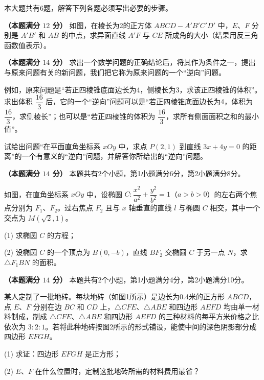本大题共有6题，解答下列各题必须写出必要的步骤。

\Needspace{0.4\textheight}
\begin{question}
\textbf{（本题满分 $12$ 分）} 如图，在棱长为2的正方体 $ABCD-A'B'C'D'$ 中，$E$、$F$ 分别是 $A'B'$ 和 $AB$ 的中点，求异面直线 $A'F$ 与 $CE$ 所成角的大小（结果用反三角函数值表示）。
\nopagebreak[4]
\begin{center}\end{center}
\nopagebreak[4]
\end{question}
\begin{question}
\textbf{（本题满分 $14$ 分）} 求出一个数学问题的正确结论后，将其作为条件之一，提出与原来问题有关的新问题，我们把它称为原来问题的一个“逆向”问题。

例如，原来问题是“若正四棱锥底面边长为4，侧棱长为3，求该正四棱锥的体积”。求出体积 $\dfrac{16}3$ 后，它的一个“逆向”问题可以是“若正四棱锥底面边长为4，体积为 $\dfrac{16}3$，求侧棱长”；也可以是“若正四棱锥的体积为 $\dfrac{16}3$，求所有侧面面积之和的最小值”。

试给出问题“在平面直角坐标系 $xOy$ 中，求点 $P(2,1)$ 到直线 $3x+4y=0$ 的距离”的一个有意义的“逆向”问题，并解答你所给出的“逆向”问题。

\Needspace{0.4\textheight}
\end{question}
\begin{question}
\textbf{（本题满分 $14$ 分）} 本题共有2个小题，第1小题满分6分，第2小题满分8分。

如图，在直角坐标系 $xOy$ 中，设椭圆 $C:\dfrac{x^2}{a^2}+\dfrac{y^2}{b^2}=1$（$a>b>0$）的左右两个焦点分别为 $F_1$、$F_2$。过右焦点 $F_2$ 且与 $x$ 轴垂直的直线 $l$ 与椭圆 $C$ 相交，其中一个交点为 $M(\sqrt2,1)$。

(1) 求椭圆 $C$ 的方程；

(2) 设椭圆 $C$ 的一个顶点为 $B(0,-b)$，直线 $BF_2$ 交椭圆 $C$ 于另一点 $N$，求 $\triangle F_1BN$ 的面积。
\nopagebreak[4]
\begin{center}\end{center}
\nopagebreak[4]
\Needspace{0.4\textheight}
\end{question}
\begin{question}
\textbf{（本题满分 $14$ 分）} 本题共有2个小题，第1小题满分4分，第2小题满分10分。

某人定制了一批地砖。每块地砖（如图1所示）是边长为0.4米的正方形 $ABCD$，点 $E$、$F$ 分别在边 $BC$ 和 $CD$ 上，$\triangle CFE$、$\triangle ABE$ 和四边形 $AEFD$ 均由单一材料制成，制成 $\triangle CFE$、$\triangle ABE$ 和四边形 $AEFD$ 的三种材料的每平方米价格之比依次为 $3:2:1$。若将此种地砖按图2所示的形式铺设，能使中间的深色阴影部分成四边形 $EFGH$。

(1) 求证：四边形 $EFGH$ 是正方形；

(2) $E$、$F$ 在什么位置时，定制这批地砖所需的材料费用最省？
\nopagebreak[4]
\begin{center}\end{center}
\nopagebreak[4]
\Needspace{0.4\textheight}
\end{question}
